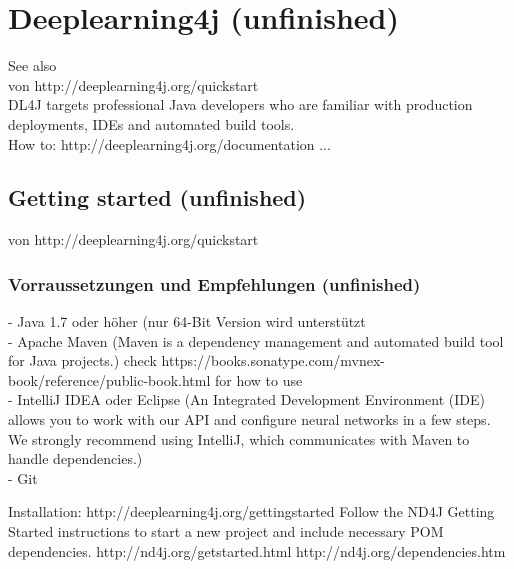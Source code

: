 \chapter{Deeplearning4j (unfinished)}
{See also \cite{DL4J}\\
von http://deeplearning4j.org/quickstart\\
DL4J targets professional Java developers who are familiar with production deployments, IDEs and automated build tools.\\

How to:
http://deeplearning4j.org/documentation
...

\section{Getting started (unfinished)}
von http://deeplearning4j.org/quickstart\\

\subsection{Vorraussetzungen und Empfehlungen (unfinished)}
- Java 1.7 oder höher (nur 64-Bit Version wird unterstützt\\
- Apache Maven (Maven is a dependency management and automated build tool for Java projects.) check https://books.sonatype.com/mvnex-book/reference/public-book.html for how to use\\
- IntelliJ IDEA oder Eclipse (An Integrated Development Environment (IDE) allows you to work with our API and configure neural networks in a few steps. We strongly recommend using IntelliJ, which communicates with Maven to handle dependencies.)\\
- Git

Installation:
http://deeplearning4j.org/gettingstarted
Follow the ND4J Getting Started instructions to start a new project and include necessary POM dependencies.
http://nd4j.org/getstarted.html
http://nd4j.org/dependencies.htm

}
